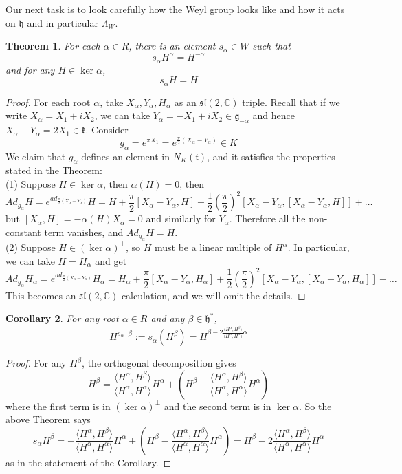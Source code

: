 \documentclass[11pt]{article}
\newtheorem{theorem}{Theorem}[section]
\newtheorem{corollary}[theorem]{Corollary}
\newcommand{\bb}[1]{\mathbb{#1}}
\newcommand{\mf}[1]{\mathfrak{#1}}
\begin{document}
\noindent Our next task is to look carefully how the Weyl group looks like and how it acts on $\mf{h}$ and in particular $\Lambda_W$.
\begin{theorem}
For each $\alpha \in R$, there is an element $s_{\alpha} \in W$ such that
$$s_{\alpha}H^{\alpha} = H^{-\alpha}$$
and for any $H \in \ker \alpha$,
$$s_{\alpha}H = H$$
\end{theorem}
\begin{proof}
For each root $\alpha$, take $X_{\alpha}, Y_{\alpha}, H_{\alpha}$ as an $\mf{sl}(2,\bb{C})$ triple. Recall that if we write $X_{\alpha} = X_1 + iX_2$, we can take $Y_{\alpha} = -X_1 + iX_2 \in \mf{g}_{-\alpha}$ and hence $X_{\alpha} - Y_{\alpha} = 2X_1 \in \mf{k}$. Consider
$$g_{\alpha} = e^{\pi X_1} = e^{\frac{\pi}{2}(X_{\alpha} - Y_{\alpha})} \in K$$
We claim that $g_{\alpha}$ defines an element in $N_K(\mf{t})$, and it satisfies the properties stated in the Theorem:\\
(1) Suppose $H \in \ker \alpha$, then $\alpha(H) = 0$, then
$$Ad_{g_{\alpha}}H = e^{ad_{\frac{\pi}{2}(X_{\alpha} - Y_{\alpha})}}H = H + \frac{\pi}{2}[X_{\alpha} - Y_{\alpha},H] + \frac{1}{2}(\frac{\pi}{2})^2[X_{\alpha} - Y_{\alpha},[X_{\alpha} - Y_{\alpha},H]] + \dots$$
but $[X_{\alpha},H] = -\alpha(H)X_{\alpha} = 0$ and similarly for $Y_{\alpha}$. Therefore all the non-constant term vanishes, and $Ad_{g_{\alpha}}H = H$.\\
(2) Suppose $H \in (\ker \alpha)^{\perp}$, so $H$ must be a linear multiple of $H^{\alpha}$. In particular, we can take $H = H_{\alpha}$ and get
$$Ad_{g_{\alpha}}H_{\alpha} = e^{ad_{\frac{\pi}{2}(X_{\alpha} - Y_{\alpha})}}H_{\alpha} = H_{\alpha} + \frac{\pi}{2}[X_{\alpha} - Y_{\alpha},H_{\alpha}] + \frac{1}{2}(\frac{\pi}{2})^2[X_{\alpha} - Y_{\alpha},[X_{\alpha} - Y_{\alpha},H_{\alpha}]] + \dots$$
This becomes an $\mf{sl}(2,\bb{C})$ calculation, and we will omit the details.
\end{proof}

\begin{corollary}
For any root $\alpha \in R$ and any $\beta \in \mf{h}^*$,
$$H^{s_{\alpha} \cdot \beta} := s_{\alpha}(H^{\beta}) = H^{\beta - 2\frac{ \langle H^{\alpha}, H^{\beta} \rangle}{ \langle H^{\alpha}, H^{\alpha} \rangle} \alpha} $$
\end{corollary}
\begin{proof}
For any $H^{\beta}$, the orthogonal decomposition gives
$$H^{\beta} = \frac{\langle H^{\alpha}, H^{\beta} \rangle}{ \langle H^{\alpha}, H^{\alpha} \rangle} H^{\alpha} + (H^{\beta} - \frac{\langle H^{\alpha}, H^{\beta} \rangle}{ \langle H^{\alpha}, H^{\alpha} \rangle} H^{\alpha})$$
where the first term is in $(\ker \alpha)^{\perp}$ and the second term is in $\ker \alpha$. So the above Theorem says
$$s_{\alpha}H^{\beta} = -\frac{\langle H^{\alpha}, H^{\beta} \rangle}{ \langle H^{\alpha}, H^{\alpha} \rangle} H^{\alpha} + (H^{\beta} - \frac{\langle H^{\alpha}, H^{\beta} \rangle}{ \langle H^{\alpha}, H^{\alpha} \rangle} H^{\alpha}) = H^{\beta} - 2\frac{\langle H^{\alpha}, H^{\beta} \rangle}{ \langle H^{\alpha}, H^{\alpha} \rangle} H^{\alpha}$$
as in the statement of the Corollary.
\end{proof}
\end{document}
